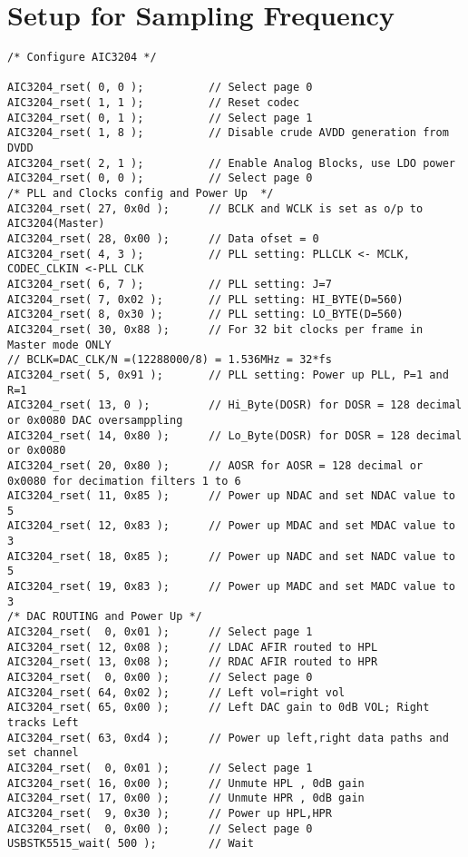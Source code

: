 \chapter{Setup for Sampling Frequency}\label{ch:code_shit_fick}

\begin{lstlisting}
/* Configure AIC3204 */

AIC3204_rset( 0, 0 );          // Select page 0
AIC3204_rset( 1, 1 );          // Reset codec
AIC3204_rset( 0, 1 );          // Select page 1
AIC3204_rset( 1, 8 );          // Disable crude AVDD generation from DVDD
AIC3204_rset( 2, 1 );          // Enable Analog Blocks, use LDO power
AIC3204_rset( 0, 0 );          // Select page 0
/* PLL and Clocks config and Power Up  */
AIC3204_rset( 27, 0x0d );      // BCLK and WCLK is set as o/p to AIC3204(Master)
AIC3204_rset( 28, 0x00 );      // Data ofset = 0
AIC3204_rset( 4, 3 );          // PLL setting: PLLCLK <- MCLK, CODEC_CLKIN <-PLL CLK
AIC3204_rset( 6, 7 );          // PLL setting: J=7
AIC3204_rset( 7, 0x02 );       // PLL setting: HI_BYTE(D=560)
AIC3204_rset( 8, 0x30 );       // PLL setting: LO_BYTE(D=560)
AIC3204_rset( 30, 0x88 );      // For 32 bit clocks per frame in Master mode ONLY
// BCLK=DAC_CLK/N =(12288000/8) = 1.536MHz = 32*fs
AIC3204_rset( 5, 0x91 );       // PLL setting: Power up PLL, P=1 and R=1
AIC3204_rset( 13, 0 );         // Hi_Byte(DOSR) for DOSR = 128 decimal or 0x0080 DAC oversamppling
AIC3204_rset( 14, 0x80 );      // Lo_Byte(DOSR) for DOSR = 128 decimal or 0x0080
AIC3204_rset( 20, 0x80 );      // AOSR for AOSR = 128 decimal or 0x0080 for decimation filters 1 to 6
AIC3204_rset( 11, 0x85 );      // Power up NDAC and set NDAC value to 5
AIC3204_rset( 12, 0x83 );      // Power up MDAC and set MDAC value to 3
AIC3204_rset( 18, 0x85 );      // Power up NADC and set NADC value to 5
AIC3204_rset( 19, 0x83 );      // Power up MADC and set MADC value to 3
/* DAC ROUTING and Power Up */
AIC3204_rset(  0, 0x01 );      // Select page 1
AIC3204_rset( 12, 0x08 );      // LDAC AFIR routed to HPL
AIC3204_rset( 13, 0x08 );      // RDAC AFIR routed to HPR
AIC3204_rset(  0, 0x00 );      // Select page 0
AIC3204_rset( 64, 0x02 );      // Left vol=right vol
AIC3204_rset( 65, 0x00 );      // Left DAC gain to 0dB VOL; Right tracks Left
AIC3204_rset( 63, 0xd4 );      // Power up left,right data paths and set channel
AIC3204_rset(  0, 0x01 );      // Select page 1
AIC3204_rset( 16, 0x00 );      // Unmute HPL , 0dB gain
AIC3204_rset( 17, 0x00 );      // Unmute HPR , 0dB gain
AIC3204_rset(  9, 0x30 );      // Power up HPL,HPR
AIC3204_rset(  0, 0x00 );      // Select page 0
USBSTK5515_wait( 500 );        // Wait


\end{lstlisting}
